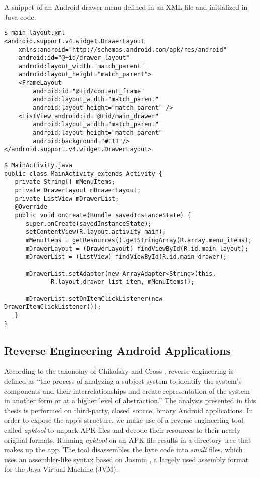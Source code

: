 \begin{listing}[!htb]
	\caption{A snippet of an Android drawer menu defined in an XML file and initialized in Java code.}
	\begin{verbatim}
$ main_layout.xml
<android.support.v4.widget.DrawerLayout
    xmlns:android="http://schemas.android.com/apk/res/android"
    android:id="@+id/drawer_layout"
    android:layout_width="match_parent"
    android:layout_height="match_parent">
    <FrameLayout
        android:id="@+id/content_frame"
        android:layout_width="match_parent"
        android:layout_height="match_parent" />
    <ListView android:id="@+id/main_drawer"
        android:layout_width="match_parent"
        android:layout_height="match_parent"
        android:background="#111"/>
</android.support.v4.widget.DrawerLayout>
\end{verbatim}
\begin{verbatim}
$ MainActivity.java
public class MainActivity extends Activity {
   private String[] mMenuItems;
   private DrawerLayout mDrawerLayout;
   private ListView mDrawerList;
   @Override
   public void onCreate(Bundle savedInstanceState) {
      super.onCreate(savedInstanceState);
      setContentView(R.layout.activity_main);
      mMenuItems = getResources().getStringArray(R.array.menu_items);    
      mDrawerLayout = (DrawerLayout) findViewById(R.id.main_layout);
      mDrawerList = (ListView) findViewById(R.id.main_drawer);
				
      mDrawerList.setAdapter(new ArrayAdapter<String>(this,
             R.layout.drawer_list_item, mMenuItems));
				
      mDrawerList.setOnItemClickListener(new DrawerItemClickListener());
   }
}
\end{verbatim}
	\label{lst:ui_example}
\end{listing}

\subsection{Reverse Engineering Android Applications}
According to the taxonomy of Chikofsky and Cross \cite{chikofsky_1990_reverse}, reverse engineering is defined as ``the process of analyzing a subject system to identify the system's components and their interrelationships and create representation of the system in another form or at a higher level of abstraction.''
The analysis presented in this thesis is performed on third-party, closed source, binary Android applications.
In order to expose the app’s structure, we make use of a reverse engineering tool called \textit{apktool} \cite{apktool} to unpack APK files and decode their resources to their nearly original formats.
Running \textit{apktool} on an APK file results in a directory tree that makes up the app.
The tool disassembles the byte code into \textit{smali} files, which uses an assembler-like syntax based on Jasmin \cite{jasmin_assembler}, a largely used assembly format for the Java Virtual Machine (JVM).

